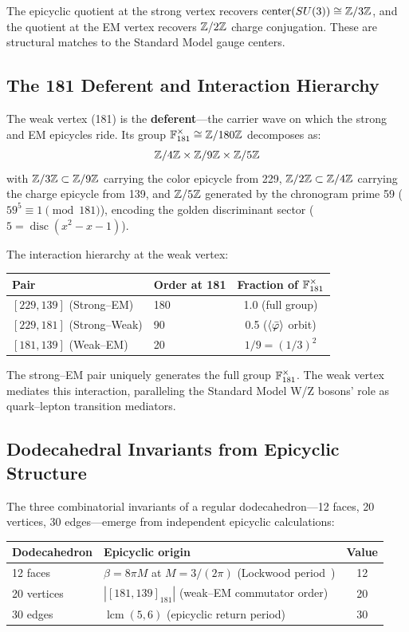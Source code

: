 The epicyclic quotient at the strong vertex recovers $\operatorname{center}(SU(3)) \cong \mathbb{Z}/3\mathbb{Z}$, and the quotient at the EM vertex recovers $\mathbb{Z}/2\mathbb{Z}$ charge conjugation. These are structural matches to the Standard Model gauge centers.

\subsection{The 181 Deferent and Interaction Hierarchy}

The weak vertex (181) is the \textbf{deferent}---the carrier wave on which the strong and EM epicycles ride. Its group $\mathbb{F}_{181}^{\times} \cong \mathbb{Z}/180\mathbb{Z}$ decomposes as:
\begin{equation}
    \mathbb{Z}/4\mathbb{Z} \times \mathbb{Z}/9\mathbb{Z} \times \mathbb{Z}/5\mathbb{Z}
\end{equation}
with $\mathbb{Z}/3\mathbb{Z} \subset \mathbb{Z}/9\mathbb{Z}$ carrying the color epicycle from 229, $\mathbb{Z}/2\mathbb{Z} \subset \mathbb{Z}/4\mathbb{Z}$ carrying the charge epicycle from 139, and $\mathbb{Z}/5\mathbb{Z}$ generated by the chronogram prime 59 ($59^5 \equiv 1 \pmod{181}$), encoding the golden discriminant sector ($5 = \operatorname{disc}(x^2 - x - 1)$).

The interaction hierarchy at the weak vertex:
\begin{center}
\begin{tabular}{llc}
\hline
Pair & Order at 181 & Fraction of $\mathbb{F}_{181}^{\times}$ \\
\hline
$[229, 139]$ (Strong--EM) & 180 & 1.0 (full group) \\
$[229, 181]$ (Strong--Weak) & 90 & 0.5 ($\langle\bar{\varphi}\rangle$ orbit) \\
$[181, 139]$ (Weak--EM) & 20 & $1/9 = (1/3)^2$ \\
\hline
\end{tabular}
\end{center}

The strong--EM pair uniquely generates the full group $\mathbb{F}_{181}^{\times}$. The weak vertex mediates this interaction, paralleling the Standard Model W/Z bosons' role as quark--lepton transition mediators.

\subsection{Dodecahedral Invariants from Epicyclic Structure}

The three combinatorial invariants of a regular dodecahedron---12 faces, 20 vertices, 30 edges---emerge from independent epicyclic calculations:
\begin{center}
\begin{tabular}{llc}
\hline
Dodecahedron & Epicyclic origin & Value \\
\hline
12 faces & $\beta = 8\pi M$ at $M = 3/(2\pi)$ (Lockwood period~\cite{lockwood_v11}) & 12 \\
20 vertices & $|[181,139]_{181}|$ (weak--EM commutator order) & 20 \\
30 edges & $\operatorname{lcm}(5, 6)$ (epicyclic return period) & 30 \\
\hline
\end{tabular}
\end{center}

